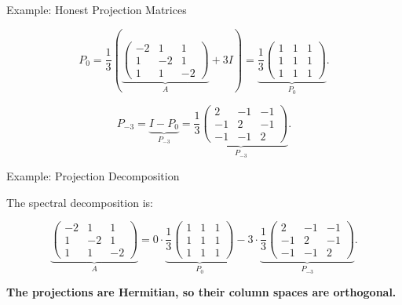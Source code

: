 \documentclass[10pt]{beamer}
\theoremstyle{definition}
\newcommand{\x}[1]{\alert{\textbf{#1}}}
\begin{document}
\begin{frame}{Example: Honest Projection Matrices}

\[
P_0
=
\frac13
\left(
\underbrace{
\begin{pmatrix}
-2&1&1\\
1&-2&1\\
1&1&-2
\end{pmatrix}}_{A}
+3I
\right)
=
\underbrace{
\frac13
\begin{pmatrix}
1&1&1\\
1&1&1\\
1&1&1
\end{pmatrix}}_{P_0}.
\]

\vfill

\[
P_{-3}
=
\underbrace{
I-P_0
}_{P_{-3}}
=
\underbrace{
\frac13
\begin{pmatrix}
2&-1&-1\\
-1&2&-1\\
-1&-1&2
\end{pmatrix}}_{P_{-3}}.
\]

\end{frame}


\begin{frame}{Example: Projection Decomposition}

The spectral decomposition is:

\[
\underbrace{
\begin{pmatrix}
-2&1&1\\
1&-2&1\\
1&1&-2
\end{pmatrix}}_{A}
=
0\cdot
\underbrace{
\frac13
\begin{pmatrix}
1&1&1\\
1&1&1\\
1&1&1
\end{pmatrix}}_{P_0}
-3\cdot
\underbrace{
\frac13
\begin{pmatrix}
2&-1&-1\\
-1&2&-1\\
-1&-1&2
\end{pmatrix}}_{P_{-3}}.
\]

\vfill

\begin{center}
\x{The projections are Hermitian, so their column spaces are orthogonal.}
\end{center}

\end{frame}
\end{document}
